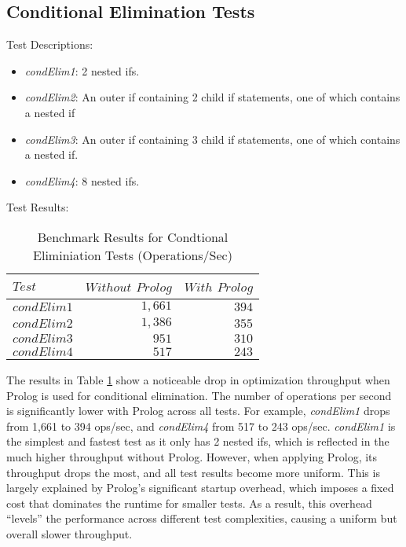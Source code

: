 \subsection*{Conditional Elimination Tests}

Test Descriptions:
\begin{itemize}
    \item \textit{condElim1}: 2 nested ifs.
    \item \textit{condElim2}: An outer if containing 2 child if statements, one of which contains a nested if
    \item \textit{condElim3}: An outer if containing 3 child if statements, one of which contains a nested if.
    \item \textit{condElim4}: 8 nested ifs.
\end{itemize}

Test Results:
\newpage
\begin{table}[h]
    \centering
    \begin{tabular}{|l|r|r|}
        \hline
        $Test$ & $Without$ $Prolog$ & $With$ $Prolog$ \\
        \hline
        $condElim1$ & $1,661$ & $394$ \\
        $condElim2$ & $1,386$ & $355$ \\
        $condElim3$ & $951$ & $310$ \\
        $condElim4$ & $517$ & $243$ \\
        \hline
    \end{tabular}
    \caption{Benchmark Results for Condtional Eliminiation Tests (Operations/Sec)}
    \label{table:condElimination}
\end{table} 
\smallbreak

\vspace{-10pt}
The results in Table \ref{table:condElimination} show a noticeable drop in optimization throughput when Prolog is used for conditional elimination. The number of operations per second is significantly lower with Prolog across all tests. For example, \textit{condElim1} drops from 1,661 to 394 ops/sec, and \textit{condElim4} from 517 to 243 ops/sec. \textit{condElim1} is the simplest and fastest test as it only has 2 nested ifs, which is reflected in the much higher throughput without Prolog. However, when applying Prolog, its throughput drops the most, and all test results become more uniform. This is largely explained by Prolog’s significant startup overhead, which imposes a fixed cost that dominates the runtime for smaller tests. As a result, this overhead “levels” the performance across different test complexities, causing a uniform but overall slower throughput.
